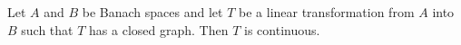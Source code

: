 Let $A$ and $B$ be Banach spaces and let $T$ be a linear transformation from $A$ into $B$ such that $T$ has a closed graph. Then $T$ is continuous.
